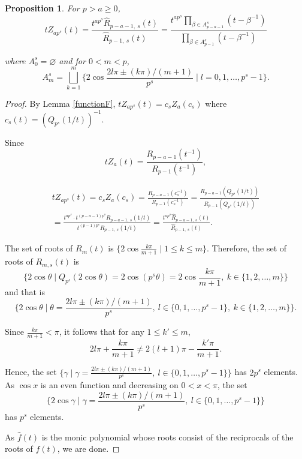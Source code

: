 \documentclass[11 pt]{amsart}
\theoremstyle{plain}
\newtheorem{prop}[thm]{Proposition}
\theoremstyle{definition}
\theoremstyle{remark}
\def\b{\beta}
\begin{document}
\begin{prop}\label{Z_apinR}
    For $p>a\ge0$, \begin{equation*}
        tZ_{ap^s}(t) =\frac{t^{ap^s }\widehat{R}_{p-a-1,\ s}(t)} {\widehat{R}_{p-1,\ s}(t)}=  \frac{t^{ap^s }\prod_{\b\in A^s_{p-a-1}}(t-\b^{-1})}{\prod_{\b\in A^s_{p-1}}(t-\b^{-1})}
    \end{equation*}

    where $A_0^s= \varnothing$ and  for $0<m <p$, $$A_{m}^s =\bigsqcup_{k=1}^m \{ 2\cos \frac{2l \pi \pm (k \pi)/(m+1)}{p^s} \mid l=0, 1, \ldots, p^s-1  \}.$$
\end{prop}
    

\begin{proof}
    By Lemma \ref{functionF}, $tZ_{ap^s}(t)=c_sZ_a(c_s)$ where $c_s(t)=(Q_{p^s}(1/t))^{-1}.$




    
    Since $$tZ_a(t)= \frac{R_{p-a-1}(t^{-1})}{R_{p-1}(t^{-1})},$$

    \begin{align*}
        tZ_{ap^s}(t) =c_s Z_a(c_s)=\frac{R_{p-a-1}(c_s^{-1})}{R_{p-1}(c_s^{-1})}=\frac{R_{p-a-1}(Q_{p^s}(1/t))}{R_{p-1}(Q_{p^s}(1/t))}\\
        =\frac{t^{ap^s}\cdot t^{(p-a-1)p^s} R_{p-a-1,\ s}(1/t) }{t^{(p-1)p^s}R_{p-1,\ s}(1/t)}=\frac{t^{ap^s }\widehat{R}_{p-a-1,\ s}(t)}{\widehat{R}_{p-1,\ s}(t)}.
    \end{align*}

The set of roots of $R_m(t)$ is $\{ 2\cos \frac{k\pi}{m+1} \mid  1 \le k \le m   \}.$ Therefore, the set of roots of $R_{m, s}(t)$ is \begin{equation*}
    \{2 \cos \theta \mid Q_{p^s}(2 \cos \theta)= 2 \cos (p^s\theta)=2 \cos \frac{k \pi}{m+1},\ k \in \{1, 2, \ldots, m\}\}\end{equation*}
    and that is \begin{equation*}
        \{2\cos \theta \mid \theta= \frac{2l\pi \pm (k\pi)/(m+1)}{p^s},\ l \in \{0, 1, \ldots, p^s-1\}, \ k \in \{1, 2, \ldots, m\}   \}.
    \end{equation*}

Since $\frac{k \pi}{m+1} < \pi$, it follows that for any $1 \le k' \le m$, $$2l\pi + \frac{k \pi}{m+1} \neq 2(l+1)\pi - \frac{k' \pi}{m+1}.$$ 

Hence, the set $\{\gamma \mid \gamma= \frac{2l\pi \pm (k\pi)/(m+1)}{p^s},\ l \in \{0, 1, \ldots, p^s-1\}   \}$ has $2p^s$ elements. As $\cos x$ is an even function and decreasing on $0 < x < \pi$, the set $$\{2\cos \gamma \mid \gamma= \frac{2l\pi \pm (k\pi)/(m+1)}{p^s},\ l \in \{0, 1, \ldots, p^s-1\}   \}$$ has $p^s$ elements.

As $\hat{f}(t)$ is the monic polynomial whose roots consist of the reciprocals of the roots of $f(t)$, we are done.    
\end{proof}
\end{document}
